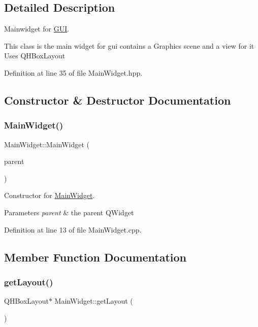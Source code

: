 \subsection{Detailed Description}
Mainwidget for \mbox{\hyperlink{classGUI}{G\+UI}}. 

This class is the main widget for gui contains a Graphics scene and a view for it Uses Q\+H\+Box\+Layout 

Definition at line 35 of file Main\+Widget.\+hpp.



\subsection{Constructor \& Destructor Documentation}
\mbox{\label{classMainWidget_a62f5aa5fe2314c6221ac49b328b72e8b}} 
\subsubsection{\texorpdfstring{Main\+Widget()}{MainWidget()}}
{\footnotesize\ttfamily Main\+Widget\+::\+Main\+Widget (\begin{DoxyParamCaption}\item[{Q\+Widget $\ast$}]{parent }\end{DoxyParamCaption})}



Constructor for \mbox{\hyperlink{classMainWidget}{Main\+Widget}}. 


\begin{DoxyParams}{Parameters}
{\em parent} & the parent Q\+Widget \\
\hline
\end{DoxyParams}


Definition at line 13 of file Main\+Widget.\+cpp.



\subsection{Member Function Documentation}
\mbox{\label{classMainWidget_a639b465bb49eb31e1c09051ae047951f}} 
\subsubsection{\texorpdfstring{get\+Layout()}{getLayout()}}
{\footnotesize\ttfamily Q\+H\+Box\+Layout$\ast$ Main\+Widget\+::get\+Layout (\begin{DoxyParamCaption}{ }\end{DoxyParamCaption})\hspace{0.3cm}{\ttfamily [inline]}}



